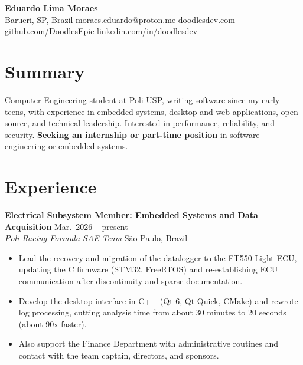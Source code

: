 \documentclass[10pt,a4paper]{article}
\newcommand{\entry}[4]{%
  \textbf{#1} \hfill {\small #3}\\
  {\itshape\color{subgray} #2} \hfill {\small\color{subgray}#4}\par
}
\begin{document}
\enlargethispage{3\baselineskip}

\begin{center}
  {\huge\bfseries Eduardo Lima Moraes}\\[4pt]
  {\small
    Barueri, SP, Brazil \;\textbar\;
    \href{mailto:moraes.eduardo@proton.me}{moraes.eduardo@proton.me} \;\textbar\;
    \href{https://www.doodlesdev.com}{doodlesdev.com}\\[1pt]
    \href{https://github.com/DoodlesEpic}{github.com/DoodlesEpic} \;\textbar\;
    \href{https://www.linkedin.com/in/doodlesdev/}{linkedin.com/in/doodlesdev}
  }
\end{center}

\vspace{0pt}

\section{Summary}
Computer Engineering student at Poli-USP, writing software since my early teens, with experience in embedded systems, desktop and web applications, open source, and technical leadership. Interested in performance, reliability, and security. \textbf{Seeking an internship or part-time position} in software engineering or embedded systems.


\section{Experience}

\entry{Electrical Subsystem Member: Embedded Systems and Data Acquisition}{Poli Racing Formula SAE Team}{Mar.\ 2026 -- present}{São Paulo, Brazil}
\begin{itemize}
  \item Lead the recovery and migration of the datalogger to the FT550 Light ECU, updating the C firmware (STM32, FreeRTOS) and re-establishing ECU communication after discontinuity and sparse documentation.
  \item Develop the desktop interface in C++ (Qt 6, Qt Quick, CMake) and rewrote log processing, cutting analysis time from about 30 minutes to 20 seconds (about 90x faster).
  \item Also support the Finance Department with administrative routines and contact with the team captain, directors, and sponsors.
\end{itemize}
\end{document}
